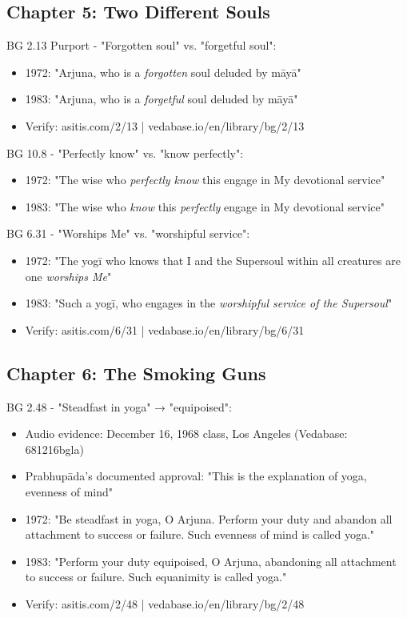 \documentclass[12pt]{article}
\begin{document}
\vspace{0.5cm}

\subsection*{Chapter 5: Two Different Souls}

BG 2.13 Purport - "Forgotten soul" vs. "forgetful soul":
\begin{itemize}
\item 1972: "Arjuna, who is a \textit{forgotten} soul deluded by māyā"
\item 1983: "Arjuna, who is a \textit{forgetful} soul deluded by māyā"
\item Verify: asitis.com/2/13 | vedabase.io/en/library/bg/2/13
\end{itemize}

BG 10.8 - "Perfectly know" vs. "know perfectly":
\begin{itemize}
\item 1972: "The wise who \textit{perfectly know} this engage in My devotional service"
\item 1983: "The wise who \textit{know} this \textit{perfectly} engage in My devotional service"
\end{itemize}

BG 6.31 - "Worships Me" vs. "worshipful service":
\begin{itemize}
\item 1972: "The yogī who knows that I and the Supersoul within all creatures are one \textit{worships Me}"
\item 1983: "Such a yogī, who engages in the \textit{worshipful service of the Supersoul}"
\item Verify: asitis.com/6/31 | vedabase.io/en/library/bg/6/31
\end{itemize}

\vspace{0.5cm}

\subsection*{Chapter 6: The Smoking Guns}

BG 2.48 - "Steadfast in yoga" → "equipoised":
\begin{itemize}
\item Audio evidence: December 16, 1968 class, Los Angeles (Vedabase: 681216bgla)
\item Prabhupāda's documented approval: "This is the explanation of yoga, evenness of mind"
\item 1972: "Be steadfast in yoga, O Arjuna. Perform your duty and abandon all attachment to success or failure. Such evenness of mind is called yoga."
\item 1983: "Perform your duty equipoised, O Arjuna, abandoning all attachment to success or failure. Such equanimity is called yoga."
\item Verify: asitis.com/2/48 | vedabase.io/en/library/bg/2/48
\end{itemize}
\end{document}
